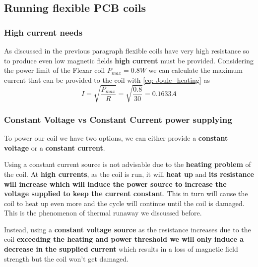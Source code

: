 \subsection{Running flexible PCB coils}

\subsubsection{High current needs}
As discussed in the previous paragraph flexible coils have very high resistance so to produce even low magnetic fields \textbf{high current} must be provided.
Considering the power limit of the Flexar coil $P_{max} = 0.8W$ we can calculate the maximum current that can be provided to the coil with \ref{eq: Joule_heating} as
\begin{equation}
    I = \sqrt{\frac{P_{max}}{R}} = \sqrt{\frac{0.8}{30}} = 0.1633A
\end{equation}

\subsubsection{Constant Voltage vs Constant Current power supplying}
To power our coil we have two options, we can either provide a \textbf{constant voltage} or a \textbf{constant current}.

Using a constant current source is not advisable due to the \textbf{heating problem} of the coil.
At \textbf{high currents}, as the coil is run, it will \textbf{heat up} and \textbf{its resistance will increase which will induce the power source to increase the voltage supplied to keep the current constant}.
This in turn will cause the coil to heat up even more and the cycle will continue until the coil is damaged.
This is the phenomenon of thermal runaway we discussed before.

Instead, using a \textbf{constant voltage source} as the resistance increases due to the coil \textbf{exceeding the heating and power threshold we will only induce a decrease in the supplied current} which results in a loss of magnetic field strength but the coil won't get damaged.

